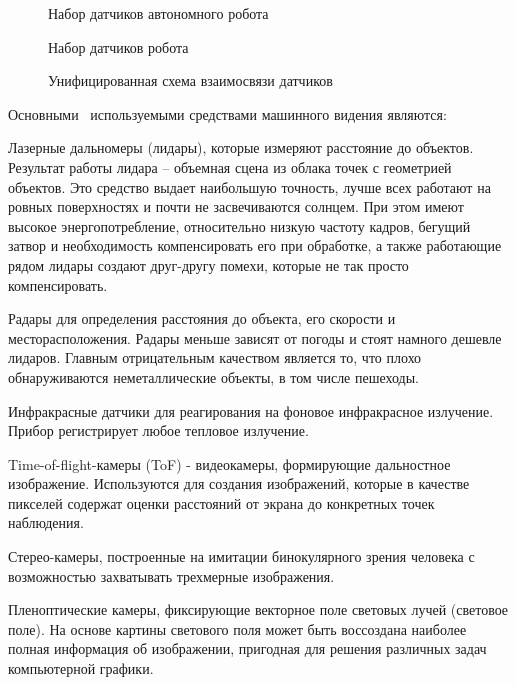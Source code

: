 \begin{figure}[ht]
    \caption{Набор датчиков автономного робота}\label{fig:robot1}
\end{figure}

\begin{figure}[ht]
    \caption{Набор датчиков робота}\label{fig:robot2}
\end{figure}

\begin{figure}[ht]
    \caption{Унифицированная схема взаимосвязи датчиков}\label{fig:sensors}
\end{figure}


Основными~\cite{confbib1} используемыми средствами машинного видения являются:

Лазерные дальномеры (лидары), которые измеряют расстояние до объектов. Результат работы лидара – объемная сцена из облака точек с геометрией объектов. Это средство выдает наибольшую точность, лучше всех работают на ровных поверхностях и почти не засвечиваются солнцем. При этом имеют высокое энергопотребление, относительно низкую частоту кадров, бегущий затвор и необходимость компенсировать его при обработке, а также работающие рядом лидары создают друг-другу помехи, которые не так просто компенсировать.

Радары для определения расстояния до объекта, его скорости и месторасположения. Радары меньше зависят от погоды и стоят намного дешевле лидаров. Главным отрицательным качеством является то, что плохо обнаруживаются неметаллические объекты, в том числе пешеходы.

Инфракрасные датчики для реагирования на фоновое инфракрасное излучение. Прибор регистрирует любое тепловое излучение.

Time-of-flight-камеры (ToF) - видеокамеры, формирующие дальностное изображение. Используются для создания изображений, которые в качестве пикселей содержат оценки расстояний от экрана до конкретных точек наблюдения.

Стерео-камеры, построенные на имитации бинокулярного зрения человека с возможностью захватывать трехмерные изображения.

Пленоптические камеры, фиксирующие векторное поле световых лучей (световое поле). На основе картины светового поля может быть воссоздана наиболее полная информация об изображении, пригодная для решения различных задач компьютерной графики.

